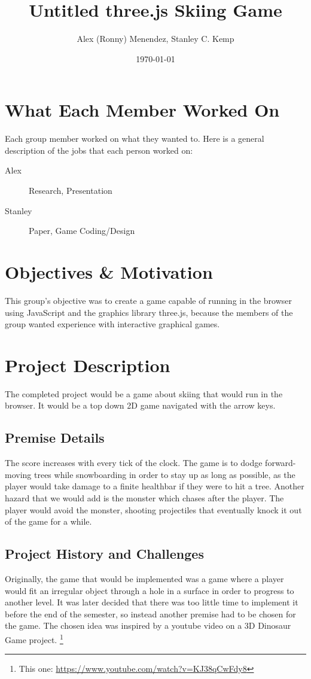 \documentclass[11pt]{article}
\author{Alex (Ronny) Menendez, Stanley C. Kemp}
\date{\today}
\title{Untitled three.js Skiing Game}
\begin{document}
\maketitle
\section{What Each Member Worked On}
\label{sec:org894e570}
Each group member worked on what they wanted to. Here is a general description of
the jobs that each person worked on:
\begin{description}
\item[{Alex}] Research, Presentation
\item[{Stanley}] Paper, Game Coding/Design
\end{description}
\section{Objectives \& Motivation}
\label{sec:org1cc242d}
This group's objective was to create a game capable of running in the browser
using JavaScript and the graphics library three.js, because the members of the
group wanted experience with interactive graphical games. 
\section{Project Description}
\label{sec:org1559b3d}
The completed project would be a game about skiing that would run in the browser.
It would be a top down 2D game navigated with the arrow keys.
\subsection{Premise Details}
\label{sec:org36cdd97}
The score increases with every tick of the clock.
The game is to dodge forward-moving trees while snowboarding in order to
stay up as long as possible, as
the player would take damage to a finite healthbar if they were to hit a tree.
Another hazard that we would add is the monster which chases after the player.
The player would avoid the monster, shooting projectiles that eventually knock
it out of the game for a while.
\subsection{Project History and Challenges}
\label{sec:orge40f4fb}
Originally, the game that would be implemented
was a game where a player would fit an irregular object
through a hole in a surface in order to progress to another level. It was later
decided that there was too little time to implement it before the end of the
semester, so instead another premise had to be chosen for the game.
The chosen idea was inspired by a youtube video on a
3D Dinosaur Game project.
\footnote{This one: \url{https://www.youtube.com/watch?v=KJ38qCwFdy8}}
\end{document}
